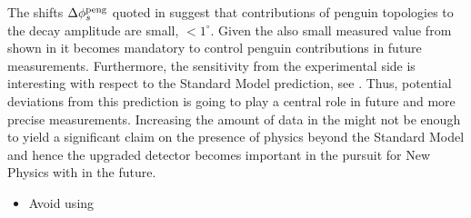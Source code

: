 The shifts $\Delta\phi_{s}^{\tiny\text{peng}}$ quoted in 
suggest that contributions of penguin topologies to the \BsJpsiPhi decay amplitude are
small, $<1^\circ$. Given the also small \phis measured value from \lhcb shown in 
it becomes mandatory to control penguin contributions in future \phis measurements.
Furthermore, the sensitivity from the experimental side is interesting with respect to
the Standard Model prediction, see . Thus, potential deviations from this
prediction is going to play a central role in future and more precise \phis measurements.
Increasing the amount of data in the \lhc \runtwo might not be enough to yield
a significant claim on the presence of physics beyond the Standard Model and hence
the upgraded \lhcb detector becomes important in the pursuit for New Physics with \phis in the future.


\begin{itemize}
  \item Avoid using \mass{\Bs}
\end{itemize}
